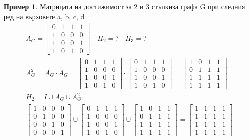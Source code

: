 \documentclass[fleqn, 12pt]{article}
\theoremstyle{definition}
\newtheorem{example}{Пример}[subsection]
\begin{document}
\begin{example}
Матрицата на достижимост за 2 и 3 стъпкиза графа G при следния ред на върховете a, b, c, d
\begin{gather*}
A_G = 
\begin{bmatrix}
0& 1 & 1 & 1 \\
1 & 0 & 0 & 0 \\
1 & 0 & 0 & 1\\
1 & 0 & 1 & 0
\end{bmatrix} 
 \quad H_2 =? \quad H_3 = ? \\
A_G ^2 = A_G \cdot A_G = 
\begin{bmatrix}
0& 1 & 1 & 1 \\
1 & 0 & 0 & 0 \\
1 & 0 & 0 & 1\\
1 & 0 & 1 & 0
\end{bmatrix}  
\cdot 
\begin{bmatrix}
0& 1 & 1 & 1 \\
1 & 0 & 0 & 0 \\
1 & 0 & 0 & 1\\
1 & 0 & 1 & 0
\end{bmatrix} = 
\begin{bmatrix}
1& 0 & 1 & 1 \\
0 & 1 & 1 & 1 \\
1 & 1 & 1 & 1\\
1 & 1 & 1 & 1
\end{bmatrix} 
 \\
H_2 = I \cup A_G \cup A_G^2 = \\
\begin{bmatrix}
1 & 0 & 0 & 0 \\
0 & 1 & 0 & 0 \\
0 & 0 & 1 & 0\\
0 & 0 & 0 & 1
\end{bmatrix} 
\cup
\begin{bmatrix}
0& 1 & 1 & 1 \\
1 & 0 & 0 & 0 \\
1 & 0 & 0 & 1\\
1 & 0 & 1 & 0
\end{bmatrix} 
\cup 
\begin{bmatrix}
1& 0 & 1 & 1 \\
0 & 1 & 1 & 1 \\
1 & 1 & 1 & 1\\
1 & 1 & 1 & 1
\end{bmatrix} 
=
\begin{bmatrix}
1& 1 & 1 & 1 \\
1 & 1 & 1 & 1 \\
1 & 1 & 1 & 1\\
1 & 1 & 1 & 1
\end{bmatrix} 
\end{gather*}


\end{example}
\end{document}
